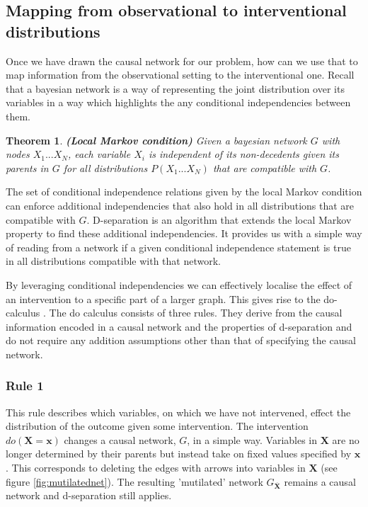 \documentclass[11pt,a4paper,oneside]{book}
\theoremstyle{plain}
\newtheorem{theorem}{Theorem}
\theoremstyle{definition}
\begin{document}
\subsection{Mapping from observational to interventional distributions}
Once we have drawn the causal network for our problem, how can we use that to map information from the observational setting to the interventional one. Recall that a bayesian network is a way of representing the joint distribution over its variables in a way which highlights the any conditional independencies between them. 

\begin{theorem}
\textbf{(Local Markov condition)} Given a bayesian network $G$ with nodes $X_{1}...X_{N}$, each variable $X_{i}$ is independent of its non-decedents given its parents in $G$ for all distributions $P(X_{1}...X_{N})$ that are compatible with $G$.
\end{theorem}

The set of conditional independence relations given by the local Markov condition can enforce additional independencies that also hold in all distributions that are compatible with $G$. D-separation is an algorithm that extends the local Markov property to find these additional independencies. It provides us with a simple way of reading from a network if a given conditional independence statement is true in all distributions compatible with that network.

By leveraging conditional independencies we can effectively localise the effect of an intervention to a specific part of a larger graph. This gives rise to the do-calculus \cite{Pearl2000}. The do calculus consists of three rules. They derive from the causal information encoded in a causal network and the properties of d-separation and do not require any addition assumptions other than that of specifying the causal network. 

\subsubsection{Rule 1}
This rule describes which variables, on which we have not intervened, effect the distribution of the outcome given some intervention. The intervention $do(\boldsymbol{X}=\boldsymbol{x})$ changes a causal network, $G$, in a simple way. Variables in $\boldsymbol{X}$ are no longer determined by their parents but instead take on fixed values specified by $\boldsymbol{x}$. This corresponds to deleting the edges with arrows into variables in $\boldsymbol{X}$  (see figure \ref{fig:mutilatednet}). The resulting 'mutilated' network $G_{\overline{\boldsymbol{X}}}$ remains a causal network and d-separation still applies. 
\end{document}

